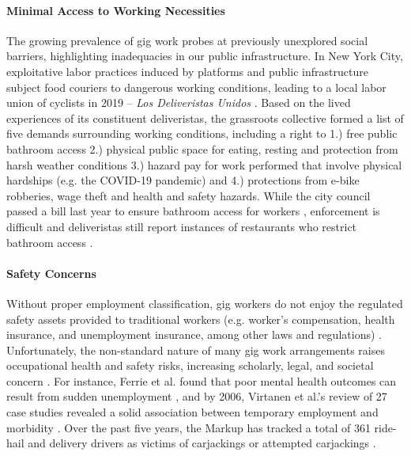 \paragraph{Minimal Access to Working Necessities}
The growing prevalence of gig work probes at previously unexplored social barriers, highlighting inadequacies in our public infrastructure. In New York City, exploitative labor practices induced by platforms and public infrastructure subject food couriers to dangerous working conditions, leading to a local labor union of cyclists in 2019 -- \textit{Los Deliveristas Unidos} \cite{geschwindt2022biking}. Based on the lived experiences of its constituent deliveristas, the grassroots collective formed a list of five demands surrounding working conditions, including a right to 1.) free public bathroom access 2.) physical public space for eating, resting and protection from harsh weather conditions 3.) hazard pay for work performed that involve physical hardships (e.g. the COVID-19 pandemic) and 4.) protections from e-bike robberies, wage theft and health and safety hazards. While the city council passed a bill last year to ensure bathroom access for workers \cite{nycbill}, enforcement is difficult and deliveristas still report instances of restaurants who restrict bathroom access  \cite{bathroomreport}.

\paragraph{Safety Concerns}
Without proper employment classification, gig workers do not enjoy the regulated safety assets provided to traditional workers (e.g. worker's compensation, health insurance, and unemployment insurance, among other laws and regulations) \cite{boundary, abraham2017measuring, kuhn2021human}. Unfortunately, the non-standard nature of many gig work arrangements raises occupational health and safety risks, increasing scholarly, legal, and societal concern \cite{orr2022necrocapitalism, Howard2017-wd, Almoqbel2019-in}. For instance, Ferrie et al. found that poor mental health outcomes can result from sudden unemployment \cite{Ferrie1998-th}, and by 2006, Virtanen et al.'s review of 27 case studies revealed a solid association between temporary employment and morbidity \cite{Virtanen2005-jp}. Over the past five years, the Markup has tracked a total of 361 ride-hail and delivery drivers as victims of carjackings or attempted carjackings \cite{Kerr_undated-zw}.

